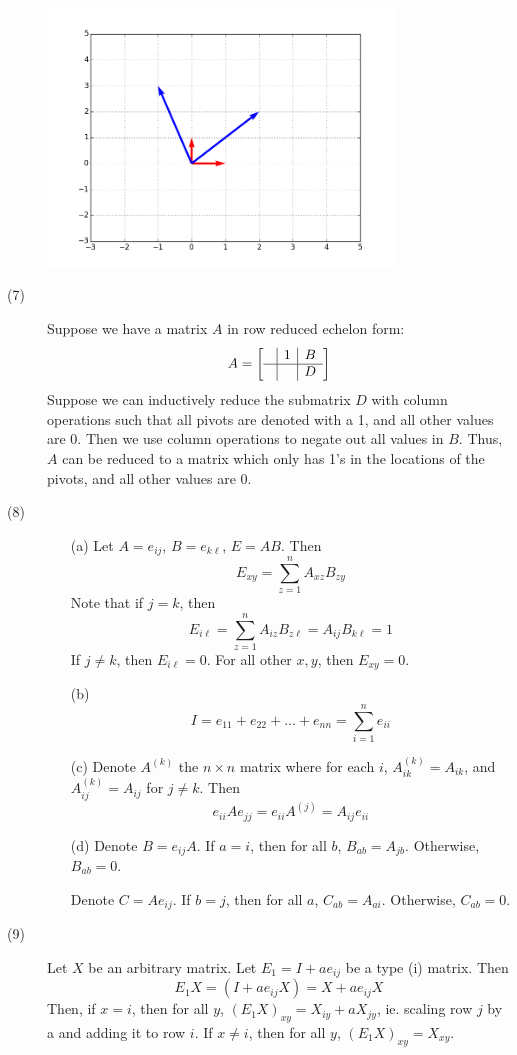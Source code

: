 \begin{description}
\includegraphics[width=0.75\textwidth]{6.png}
\item[(7)]
Suppose we have a matrix $A$ in row reduced echelon form:
$$A = \begin{bmatrix}
\begin{array}{c|c|c}
& 1 & B \\
\hline
& & D
\end{array}
\end{bmatrix}$$
Suppose we can inductively reduce the submatrix $D$ with column operations such that all pivots are denoted with a 1, and all other values are 0. Then we use column operations to negate out all values in $B$. Thus, $A$ can be reduced to a matrix which only has 1's in the locations of the pivots, and all other values are 0.
\item[(8)]
\begin{itemize}
\item[(a)]
Let $A = e_{ij}$, $B = e_{k\ell}$, $E = AB$. Then
$$E_{xy} = \sum_{z = 1}^n A_{xz}B_{zy}$$
Note that if $j=k$, then
$$E_{i\ell} = \sum_{z=1}^n A_{iz}B_{z\ell} = A_{ij}B_{k\ell} = 1$$
If $j \neq k$, then $E_{i\ell} = 0$. For all other $x, y$, then $E_{xy} = 0$. 
\item[(b)]
$$I = e_{11} + e_{22} + ... + e_{nn} = \sum_{i=1}^n e_{ii}$$
\item[(c)]
Denote $A^{(k)}$ the $n \times n$ matrix where for each $i$, $A^{(k)}_{ik} = A_{ik}$, and $A^{(k)}_{ij} = A_{ij}$ for $j \neq k$. Then
$$e_{ii}Ae_{jj} = e_{ii}A^{(j)} = A_{ij}e_{ii}$$
\item[(d)]
Denote $B = e_{ij}A$. If $a = i$, then for all $b$, $B_{ab} = A_{jb}$. Otherwise, $B_{ab} = 0$.

Denote $C = Ae_{ij}$. If $b = j$, then for all $a$, $C_{ab} = A_{ai}$. Otherwise, $C_{ab} = 0$.
\end{itemize}
\item[(9)]
Let $X$ be an arbitrary matrix. Let $E_1 = I + ae_{ij}$ be a type (i) matrix. Then
$$E_1X = (I + ae_{ij}X) = X + ae_{ij}X$$
Then, if $x = i$, then for all $y$, $(E_1X)_{xy} = X_{iy} + aX_{jy}$, ie. scaling row $j$ by a and adding it to row $i$. If $x \neq i$, then for all $y$, $(E_1X)_{xy} = X_{xy}$.


\end{description}
